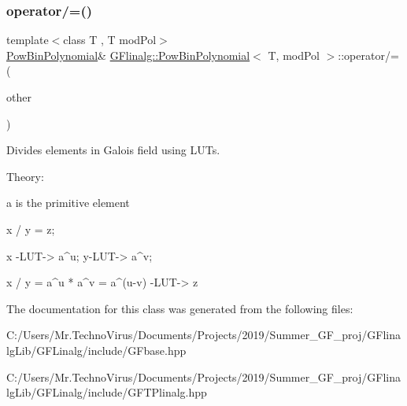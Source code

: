 \subsubsection{\texorpdfstring{operator/=()}{operator/=()}}
{\footnotesize\ttfamily template$<$class T , T mod\+Pol$>$ \\
\mbox{\hyperlink{class_g_flinalg_1_1_pow_bin_polynomial}{Pow\+Bin\+Polynomial}}\& \mbox{\hyperlink{class_g_flinalg_1_1_pow_bin_polynomial}{G\+Flinalg\+::\+Pow\+Bin\+Polynomial}}$<$ T, mod\+Pol $>$\+::operator/= (\begin{DoxyParamCaption}\item[{const \mbox{\hyperlink{class_g_flinalg_1_1_pow_bin_polynomial}{Pow\+Bin\+Polynomial}}$<$ T, mod\+Pol $>$ \&}]{other }\end{DoxyParamCaption})\hspace{0.3cm}{\ttfamily [inline]}}



Divides elements in Galois field using L\+U\+Ts. 

Theory\+: \begin{DoxyVerb}a is the primitive element

x / y = z;

x -LUT-> a^u; y-LUT-> a^v;

x / y = a^u * a^v = a^(u-v) -LUT-> z
\end{DoxyVerb}
 

The documentation for this class was generated from the following files\+:\begin{DoxyCompactItemize}
\item 
C\+:/\+Users/\+Mr.\+Techno\+Virus/\+Documents/\+Projects/2019/\+Summer\+\_\+\+G\+F\+\_\+proj/\+G\+Flinalg\+Lib/\+G\+F\+Linalg/include/G\+Fbase.\+hpp\item 
C\+:/\+Users/\+Mr.\+Techno\+Virus/\+Documents/\+Projects/2019/\+Summer\+\_\+\+G\+F\+\_\+proj/\+G\+Flinalg\+Lib/\+G\+F\+Linalg/include/G\+F\+T\+Plinalg.\+hpp\end{DoxyCompactItemize}
